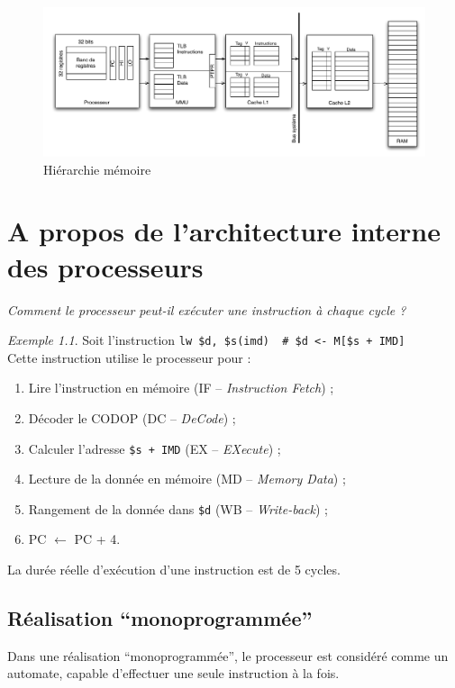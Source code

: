 \documentclass[11pt,english,french]{scrreprt}
\theoremstyle{remark}
\newtheorem*{ex*}{Exemple}
\theoremstyle{definition}
\begin{document}
\begin{figure}[h]
	\center
	\includegraphics[scale=.59]{diagrammes/hierarchie-mem}
	\caption{Hiérarchie mémoire}
\end{figure}

\chapter{A propos de l'architecture interne des processeurs} %

\emph{Comment le processeur peut-il exécuter une instruction à chaque cycle ?}

\begin{ex*}
	Soit l'instruction \lstinline!lw $d, $s(imd)  # $d <- M[$s + IMD]!\\
	Cette instruction utilise le processeur pour :\begin{enumerate}
		\item Lire l'instruction en mémoire (IF -- \emph{Instruction Fetch}) ;
		\item Décoder le CODOP (DC -- \emph{DeCode}) ;
		\item Calculer l'adresse \lstinline!$s + IMD! (EX -- \emph{EXecute}) ;
		\item Lecture de la donnée en mémoire (MD -- \emph{Memory Data}) ;
		\item Rangement de la donnée dans \lstinline!$d! (WB -- \emph{Write-back}) ;
		\item PC $\leftarrow$ PC + 4.
	\end{enumerate}
\end{ex*}

La durée réelle d'exécution d'une instruction est de 5 cycles.

\section{Réalisation ``monoprogrammée''} %
Dans une réalisation ``monoprogrammée'', le processeur est considéré comme un automate, capable d'effectuer une seule instruction à la fois.
\end{document}
